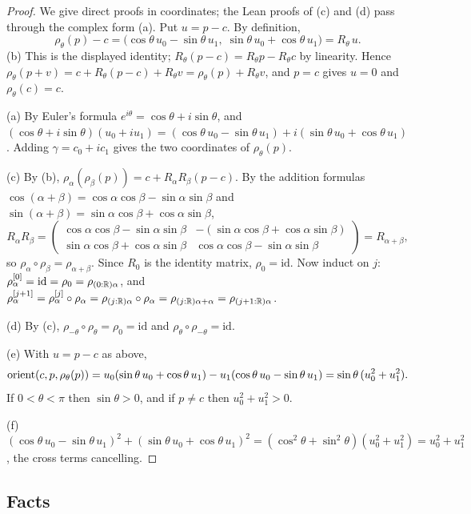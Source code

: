 \begin{proof}
We give direct proofs in coordinates; the Lean proofs of (c) and (d) pass through the complex form (a).
Put $u=p-c$. By definition,
\[
  \rho_\theta(p)-c=\bigl(\cos\theta\,u_0-\sin\theta\,u_1,\;\sin\theta\,u_0+\cos\theta\,u_1\bigr)
  =R_\theta\,u .
\]
(b) This is the displayed identity; $R_\theta(p-c)=R_\theta p-R_\theta c$ by linearity. Hence
$\rho_\theta(p+v)=c+R_\theta(p-c)+R_\theta v=\rho_\theta(p)+R_\theta v$, and $p=c$ gives $u=0$ and
$\rho_\theta(c)=c$.

(a) By Euler's formula $e^{i\theta}=\cos\theta+i\sin\theta$, and
$(\cos\theta+i\sin\theta)(u_0+iu_1)=(\cos\theta\,u_0-\sin\theta\,u_1)+i(\sin\theta\,u_0+\cos\theta\,u_1)$.
Adding $\gamma=c_0+ic_1$ gives the two coordinates of $\rho_\theta(p)$.

(c) By (b), $\rho_\alpha(\rho_\beta(p))=c+R_\alpha R_\beta(p-c)$. By the addition formulas
$\cos(\alpha+\beta)=\cos\alpha\cos\beta-\sin\alpha\sin\beta$ and
$\sin(\alpha+\beta)=\sin\alpha\cos\beta+\cos\alpha\sin\beta$,
\[
  R_\alpha R_\beta=
  \begin{pmatrix}\cos\alpha\cos\beta-\sin\alpha\sin\beta&-(\sin\alpha\cos\beta+\cos\alpha\sin\beta)\\
  \sin\alpha\cos\beta+\cos\alpha\sin\beta&\cos\alpha\cos\beta-\sin\alpha\sin\beta\end{pmatrix}
  =R_{\alpha+\beta},
\]
so $\rho_\alpha\circ\rho_\beta=\rho_{\alpha+\beta}$. Since $R_0$ is the identity matrix, $\rho_0=\mathrm{id}$.
Now induct on $j$: $\rho_\alpha^{[0]}=\mathrm{id}=\rho_0=\rho_{(0:\mathbb R)\alpha}$, and
$\rho_\alpha^{[j+1]}=\rho_\alpha^{[j]}\circ\rho_\alpha=\rho_{(j:\mathbb R)\alpha}\circ\rho_\alpha
=\rho_{(j:\mathbb R)\alpha+\alpha}=\rho_{(j+1:\mathbb R)\alpha}$.

(d) By (c), $\rho_{-\theta}\circ\rho_\theta=\rho_0=\mathrm{id}$ and $\rho_\theta\circ\rho_{-\theta}=\mathrm{id}$.

(e) With $u=p-c$ as above,
\[
  \operatorname{orient}(c,p,\rho_\theta(p))=u_0(\sin\theta\,u_0+\cos\theta\,u_1)-u_1(\cos\theta\,u_0-\sin\theta\,u_1)
  =\sin\theta\,(u_0^2+u_1^2).
\]
If $0<\theta<\pi$ then $\sin\theta>0$, and if $p\ne c$ then $u_0^2+u_1^2>0$.

(f) $(\cos\theta\,u_0-\sin\theta\,u_1)^2+(\sin\theta\,u_0+\cos\theta\,u_1)^2
=(\cos^2\theta+\sin^2\theta)(u_0^2+u_1^2)=u_0^2+u_1^2$, the cross terms cancelling.
\end{proof}

\subsection{Facts}\label{fd:sec-facts}

